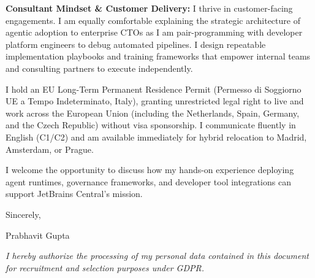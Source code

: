 \documentclass[10.5pt,a4paper]{article}
\begin{document}
\textbf{Consultant Mindset \& Customer Delivery:} I thrive in customer-facing engagements. I am equally comfortable explaining the strategic architecture of agentic adoption to enterprise CTOs as I am pair-programming with developer platform engineers to debug automated pipelines. I design repeatable implementation playbooks and training frameworks that empower internal teams and consulting partners to execute independently.

I hold an EU Long-Term Permanent Residence Permit (Permesso di Soggiorno UE a Tempo Indeterminato, Italy), granting unrestricted legal right to live and work across the European Union (including the Netherlands, Spain, Germany, and the Czech Republic) without visa sponsorship. I communicate fluently in English (C1/C2) and am available immediately for hybrid relocation to Madrid, Amsterdam, or Prague.

I welcome the opportunity to discuss how my hands-on experience deploying agent runtimes, governance frameworks, and developer tool integrations can support JetBrains Central's mission.

Sincerely,

Prabhavit Gupta

\vspace{0.6em}
{\footnotesize \textit{I hereby authorize the processing of my personal data contained in this document for recruitment and selection purposes under GDPR.}\par}
\end{document}
